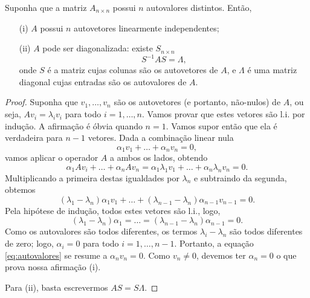 \begin{teo}\label{teo:diagonalizacao}
  Suponha que a matriz $A_{n\times n}$ possui $n$ autovalores distintos. Então,
  \begin{itemize}
  \item[(i)] $A$ possui $n$ autovetores linearmente independentes;
  \item[(ii)] $A$ pode ser diagonalizada: existe $S_{n\times n}$
    \begin{equation*}
      S^{-1}AS=\Lambda,
    \end{equation*}
    onde $S$ é a matriz cujas colunas são os autovetores de $A$, e $\Lambda$ é uma matriz diagonal cujas entradas são os autovalores de $A$.
  \end{itemize}
\end{teo}
\begin{proof}
Suponha que $v_1,\ldots,v_n$ são os autovetores (e portanto, não-nulos) de $A$, ou seja, $Av_i=\lambda_i v_i$ para todo $i=1,\ldots,n$. Vamos provar que estes vetores são l.i. por indução. A afirmação é óbvia quando $n=1$. Vamos supor então que ela é verdadeira para $n-1$ vetores. Dada a combinação linear nula
\begin{equation}\label{eq:autovalores}
  \alpha_1 v_1 + \ldots + \alpha_nv_n = 0,
\end{equation}
vamos aplicar o operador $A$ a ambos os lados, obtendo
\begin{equation*}
  \alpha_1 Av_i + \ldots + \alpha_n Av_n = \alpha_1\lambda_1v_1 + \ldots +\alpha_n \lambda_n v_n = 0.
\end{equation*}
Multiplicando a primeira destas igualdades por $\lambda_n$ e subtraindo da segunda, obtemos
\begin{equation*}
  (\lambda_1-\lambda_n)\alpha_1v_1 + \ldots + (\lambda_{n-1}-\lambda_n)\alpha_{n-1}v_{n-1} = 0.
\end{equation*}
Pela hipótese de indução, todos estes vetores são l.i., logo, 
\begin{equation*}
   (\lambda_1-\lambda_n)\alpha_1 = \ldots = (\lambda_{n-1}-\lambda_n)\alpha_{n-1} = 0.
\end{equation*}
Como os autovalores são todos diferentes, os termos $\lambda_i-\lambda_n$ são todos diferentes de zero; logo, $\alpha_i = 0$ para todo $i=1,\ldots,n-1$. Portanto, a equação \eqref{eq:autovalores} se resume a $\alpha_nv_n=0$. Como $v_n\ne 0$, devemos ter $\alpha_n=0$ o que prova nossa afirmação (i).

Para (ii), basta escrevermos $AS=S\Lambda$.
\end{proof}

